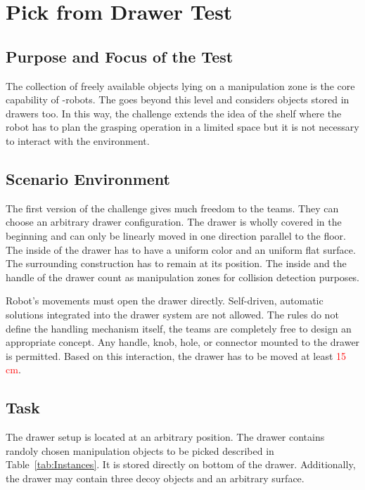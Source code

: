 \newpage
\section{Pick from Drawer Test}




\subsection{Purpose and Focus of the Test}
The collection of freely available objects lying on a manipulation zone is the core capability of \RCAW-robots. The  goes beyond this level and considers objects stored in drawers too. In this way, the challenge
extends the idea of the shelf where the robot has to plan the grasping operation in a limited space but it is not necessary to interact with the environment.

\subsection{Scenario Environment}
The first version of the challenge gives much freedom to the teams. They can choose an arbitrary drawer configuration. The drawer is wholly covered in the beginning and can only be linearly moved in one direction parallel to the floor. The inside of the drawer has to have a uniform color and an uniform flat surface. The surrounding construction has to remain at its position. The inside and the handle of the drawer count as manipulation zones for collision detection purposes.

\par
Robot's movements must open the drawer directly. Self-driven, automatic solutions integrated into the drawer system are not allowed.
The rules do not define the handling mechanism itself, the teams are completely free to design an appropriate concept. Any handle, knob, hole, or connector mounted to the drawer is permitted. Based on this interaction, the drawer has to be moved at least \textcolor{red}{15 cm}. 

\subsection{Task}
The drawer setup is located at an arbitrary position. The drawer contains randoly chosen manipulation objects to be picked described in Table~\ref{tab:Instances}. It is stored directly on bottom of the drawer. Additionally, the drawer may contain three decoy objects and an arbitrary surface. 

